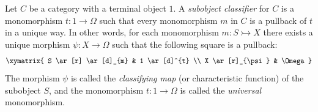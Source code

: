 Let $C$ be a category with a terminal object $1$. A \emph{subobject classifier} for $C$ is a monomorphism $t \colon 1 \to \Omega$ such that every monomorphism $m$ in $C$ is a pullback of $t$ in a unique way. In other words, for each monomorphism $m \colon S \rightarrowtail X$ there exists a unique morphism $\psi \colon X \to \Omega$ such that the following square is a pullback:
$$
\xymatrix{
  S \ar[r] \ar[d]_{m} & 1 \ar[d]^{t} \\
  X \ar[r]_{\psi} & \Omega
}
$$
The morphism $\psi$ is called the \emph{classifying map} (or characteristic function) of the subobject $S$, and the monomorphism $t \colon 1 \to \Omega$ is called the \emph{universal} monomorphism.

